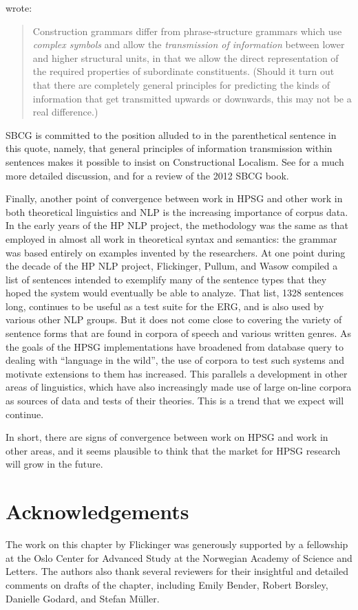 \documentclass[output=paper
                ,modfonts
                ,nonflat
	        ,collection
	        ,collectionchapter
	        ,collectiontoclongg
 	        ,biblatex
                ,babelshorthands
                ,newtxmath
                ,draftmode
                ,colorlinks, citecolor=brown
]{./langsci/langscibook}
\begin{document}
\citet[]{Fillmore88a} wrote:
\begin{quote}
Construction grammars differ from phrase-structure grammars which use \emph{complex symbols} and
allow the \emph{transmission of information} between lower and higher structural units, in that we
allow the direct representation of the required properties of subordinate constituents.  (Should it
turn out that there are completely general principles for predicting the kinds of information that
get transmitted upwards or downwards, this may not be a real difference.) \citep[]{Fillmore88a}
\end{quote}
SBCG is committed to the position alluded to in the parenthetical sentence in this quote, namely, that general principles of information transmission within sentences makes it possible to insist on Constructional Localism.   See  for a much more detailed discussion, and \citet{VanEynde2015a} for a review of the 2012 SBCG book.  

Finally, another point of convergence between work in HPSG and other work in both theoretical linguistics and NLP is the increasing importance of corpus data. In the early years of the HP NLP project, the methodology was the same as that employed in almost all work in theoretical syntax and semantics:  the grammar was based entirely on examples invented by the researchers.  At one point during the decade of the HP NLP project, Flickinger, Pullum, and Wasow compiled a list of sentences intended to exemplify many of the sentence types that they hoped the system would eventually be able to analyze.  That list, 1328 sentences long, continues to be useful as a test suite for the ERG, and is also used by various other NLP groups.  But it does not come close to covering the variety of sentence forms that are found in corpora of speech and various written genres.  As the goals of the HPSG implementations have broadened from database query to dealing with ``language in the wild'', the use of corpora to test such systems and motivate extensions to them has increased.  This parallels a development in other areas of linguistics, which have also increasingly made use of large on-line corpora as sources of data and tests of
their theories.  This is a trend that we expect will continue.
 
In short, there are signs of convergence between work on HPSG and work in other areas, and it seems plausible to think that the market for HPSG research will grow in the future.

\section*{Acknowledgements}
The work on this chapter by Flickinger was generously supported by a fellowship at the Oslo Center for Advanced Study at the Norwegian Academy of Science and Letters.  The authors also thank several reviewers for their insightful and detailed comments on drafts of the chapter, including Emily Bender, Robert Borsley, Danielle Godard, and Stefan M{\"u}ller.


{\sloppy
\printbibliography[heading=subbibliography,notkeyword=this]
}
\end{document}
